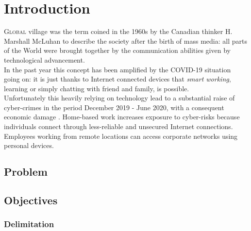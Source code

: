 \chapter{Introduction}
\label{chap:intro}

\lettrine[lines=3, findent=3pt, nindent=0pt]{G}{lobal} village was the term coined in the 1960s by the Canadian thinker H. Marshall McLuhan \cite{mcluhan1962} to describe the society after the birth of mass media: all parts of the World were brought together by the communication abilities given by technological advancement. \\
In the past year this concept has been amplified by the COVID-19 situation going on: it is just thanks to Internet connected devices that \textit{smart working}, learning or simply chatting with friend and family, is possible. \\
Unfortunately this heavily relying on technology lead to a substantial raise of cyber-crimes in the period December 2019 - June 2020, with a consequent economic damage \cite{SAJIM1277}. Home-based work increases exposure to cyber-risks because individuals connect through less-reliable and unsecured Internet connections. Employees working from remote locations can access corporate networks using personal devices.




\section{Problem}
\label{sec:problem}

\lipsum[1-3]


\section{Objectives}
\label{sec:objectives}

\lipsum[1-2]


\subsection{Delimitation}
\label{subsec:delimitation}

\lipsum[1]


